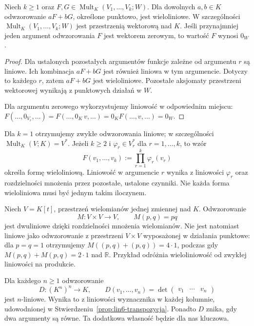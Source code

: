 \begin{stwierdzenie}
\label{prop:lin8-punktowe}
Niech \(k\geq1\) oraz
\(F,G\in\operatorname{Mult}_K(V_1,\ldots,V_k;W)\).
Dla dowolnych \(a,b\in K\)
odwzorowanie \(aF+bG\), określone punktowo,
jest wieloliniowe. W szczególności
\(\operatorname{Mult}_K(V_1,\ldots,V_k;W)\)
jest przestrzenią wektorową nad \(K\).
Jeśli przynajmniej jeden argument
odwzorowania \(F\) jest wektorem zerowym,
to wartość \(F\) wynosi \(0_W\).
\end{stwierdzenie}
\begin{proof}
Dla ustalonych pozostałych argumentów
funkcje zależne od argumentu \(r\)
są liniowe. Ich kombinacja
\(aF+bG\) jest również liniowa
w tym argumencie.
Dotyczy to każdego \(r\), zatem
\(aF+bG\) jest wieloliniowe.
Pozostałe aksjomaty przestrzeni
wektorowej wynikają z punktowych
działań w \(W\).

Dla argumentu zerowego wykorzystujemy
liniowość w odpowiednim miejscu:
\(F(\ldots,0_{V_r},\ldots)
=F(\ldots,0_K\,v,\ldots)
=0_KF(\ldots,v,\ldots)=0_W\).
\end{proof}

\begin{przyklad}
\label{prz:lin8-iloczyn-funkcjonalow}
Dla \(k=1\) otrzymujemy zwykłe
odwzorowania liniowe; w szczególności
\(\operatorname{Mult}_K(V;K)=V^*\).
Jeżeli \(k\geq2\) i
\(\varphi_r\in V_r^*\)
dla \(r=1,\ldots,k\), to wzór
\[
 F(v_1,\ldots,v_k)
 :=\prod_{r=1}^k\varphi_r(v_r)
\]
określa formę wieloliniową.
Liniowość w argumencie \(r\)
wynika z liniowości \(\varphi_r\)
oraz rozdzielności mnożenia przez
pozostałe, ustalone czynniki.
Nie każda forma wieloliniowa musi być
jednym takim iloczynem.
\end{przyklad}

\begin{przyklad}
\label{prz:lin8-wielomiany}
Niech \(V=K[t]\), przestrzeń
wielomianów jednej zmiennej
nad \(K\).
Odwzorowanie
\[
 M\colon V\times V\to V,\qquad
 M(p,q)=pq
\]
jest dwuliniowe dzięki rozdzielności
mnożenia wielomianów.
Nie jest natomiast liniowe jako
odwzorowanie z przestrzeni
\(V\times V\) wyposażonej w
działania punktowe: dla
\(p=q=1\) otrzymujemy
\(M((p,q)+(p,q))=4\cdot1\),
podczas gdy
\(M(p,q)+M(p,q)=2\cdot1\)
nad \(\mathbb R\).
Przykład odróżnia wieloliniowość
od zwykłej liniowości na produkcie.
\end{przyklad}

\begin{przyklad}
\label{prz:lin8-determinant}
Dla każdego \(n\geq1\)
odwzorowanie
\[
 D\colon (K^n)^n\to K,\qquad
 D(v_1,\ldots,v_n)
 =\det\begin{pmatrix}v_1&\cdots&v_n\end{pmatrix}
\]
jest \(n\)-liniowe.
Wynika to z liniowości wyznacznika
w każdej kolumnie, udowodnionej w
Stwierdzeniu~\ref{prop:lin6-transpozycja}.
Ponadto \(D\) znika, gdy dwa
argumenty są równe. Ta dodatkowa
własność będzie dla nas kluczowa.
\end{przyklad}

